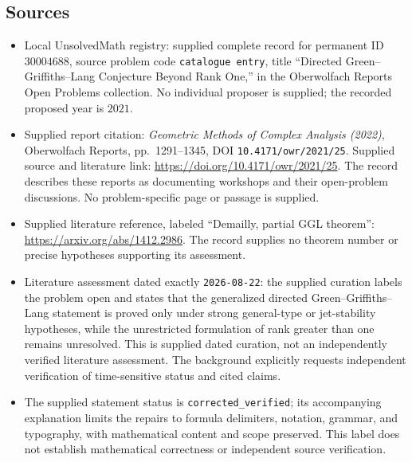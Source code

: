 \documentclass[11pt]{article}
\begin{document}
\subsection{Sources}
\begin{itemize}
\item Local UnsolvedMath registry: supplied complete record for permanent ID \(30004688\), source problem code \texttt{catalogue entry}, title ``Directed Green--Griffiths--Lang Conjecture Beyond Rank One,'' in the Oberwolfach Reports Open Problems collection. No individual proposer is supplied; the recorded proposed year is \(2021\).
\item Supplied report citation: \emph{Geometric Methods of Complex Analysis (2022)}, Oberwolfach Reports, pp.\ 1291--1345, DOI \texttt{10.4171/owr/2021/25}. Supplied source and literature link: \url{https://doi.org/10.4171/owr/2021/25}. The record describes these reports as documenting workshops and their open-problem discussions. No problem-specific page or passage is supplied.
\item Supplied literature reference, labeled ``Demailly, partial GGL theorem'': \url{https://arxiv.org/abs/1412.2986}. The record supplies no theorem number or precise hypotheses supporting its assessment.
\item Literature assessment dated exactly \texttt{2026-08-22}: the supplied curation labels the problem open and states that the generalized directed Green--Griffiths--Lang statement is proved only under strong general-type or jet-stability hypotheses, while the unrestricted formulation of rank greater than one remains unresolved. This is supplied dated curation, not an independently verified literature assessment. The background explicitly requests independent verification of time-sensitive status and cited claims.
\item The supplied statement status is \texttt{corrected\_verified}; its accompanying explanation limits the repairs to formula delimiters, notation, grammar, and typography, with mathematical content and scope preserved. This label does not establish mathematical correctness or independent source verification.
\end{itemize}
\end{document}
